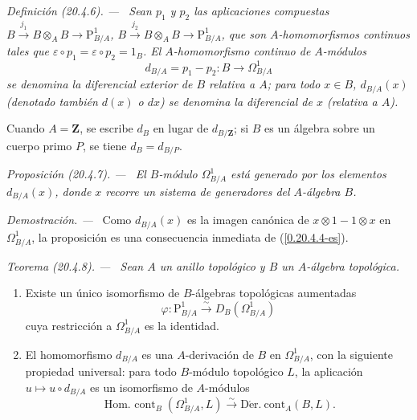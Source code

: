 \documentclass[10pt,oneside]{book}
\makeatletter
\newcommand{\sref}[1]{\textup{(\ref{#1})}}
\newcommand{\setmanualcurrentlabel}[1]{\def\@currentlabel{#1}}
\newenvironment{definition}[1][]{%
  \setmanualcurrentlabel{#1}\par\medskip\noindent\itshape Definición (#1). ---\ }{\par}
\newenvironment{proposition}[1][]{%
  \setmanualcurrentlabel{#1}\par\medskip\noindent\itshape Proposición (#1). ---\ }{\par}
\newenvironment{theorem}[1][]{%
  \setmanualcurrentlabel{#1}\par\medskip\noindent\itshape Teorema (#1). ---\ }{\par}
\newenvironment{proof}{%
  \par\medskip\noindent\textit{Demostración. ---\ }}{\par}
\providecommand{\setmin}{-}%
\makeatother
\begin{document}
\begin{definition}[20.4.6]
\label{0.20.4.6-es}
Sean $p_1$ y $p_2$ las aplicaciones compuestas
$B\xrightarrow{j_1}B\otimes_A B\to\mathrm{P}^1_{B/A}$,
$B\xrightarrow{j_2}B\otimes_A B\to\mathrm{P}^1_{B/A}$, que son
$A$-homomorfismos continuos tales que
$\varepsilon\circ p_1=\varepsilon\circ p_2=1_B$. El
$A$-homomorfismo continuo de $A$-módulos
\begin{equation}
\tag{20.4.6.1}
\label{0.20.4.6.1-es}
  d_{B/A}=p_1\setmin p_2:B\to\Omega^1_{B/A}
\end{equation}
se denomina la diferencial exterior de $B$ relativa a $A$; para
todo $x\in B$, $d_{B/A}(x)$ (denotado también $d(x)$ o $dx$) se denomina la
diferencial de $x$ (relativa a $A$).
\end{definition}

Cuando $A=\mathbf{Z}$, se escribe $d_B$ en lugar de $d_{B/\mathbf{Z}}$; si $B$
es un álgebra sobre un cuerpo primo $P$, se tiene $d_B=d_{B/P}$.

\begin{proposition}[20.4.7]
\label{0.20.4.7-es}
El $B$-módulo $\Omega^1_{B/A}$ está generado por los elementos $d_{B/A}(x)$,
donde $x$ recorre un sistema de generadores del $A$-álgebra $B$.
\end{proposition}

\begin{proof}
Como $d_{B/A}(x)$ es la imagen canónica de $x\otimes1\setmin 1\otimes x$ en
$\Omega^1_{B/A}$, la proposición es una consecuencia inmediata de
\sref{0.20.4.4-es}.
\end{proof}

\begin{theorem}[20.4.8]
\label{0.20.4.8-es}
Sean $A$ un anillo topológico y $B$ un $A$-álgebra topológica.
\begin{enumerate}
  \item[\rm(i)] Existe un único isomorfismo de $B$-álgebras topológicas
  aumentadas
\begin{equation}
\tag{20.4.8.1}
\label{0.20.4.8.1-es}
  \varphi:\mathrm{P}^1_{B/A}\xrightarrow{\sim}D_B(\Omega^1_{B/A})
\end{equation}
cuya restricción a $\Omega^1_{B/A}$ es la identidad.
  \item[\rm(ii)] El homomorfismo $d_{B/A}$ es una $A$-derivación de $B$
  en $\Omega^1_{B/A}$, con la siguiente propiedad universal: para todo
  $B$-módulo topológico $L$, la aplicación $u\mapsto u\circ d_{B/A}$ es
  un isomorfismo de $A$-módulos
\begin{equation}
\tag{20.4.8.2}
\label{0.20.4.8.2-es}
  \operatorname{Hom.\ cont}_B(\Omega^1_{B/A},L)
  \xrightarrow{\sim}\operatorname{D\acute{e}r.\ cont}_A(B,L).
\end{equation}
\end{enumerate}
\end{theorem}
\end{document}
